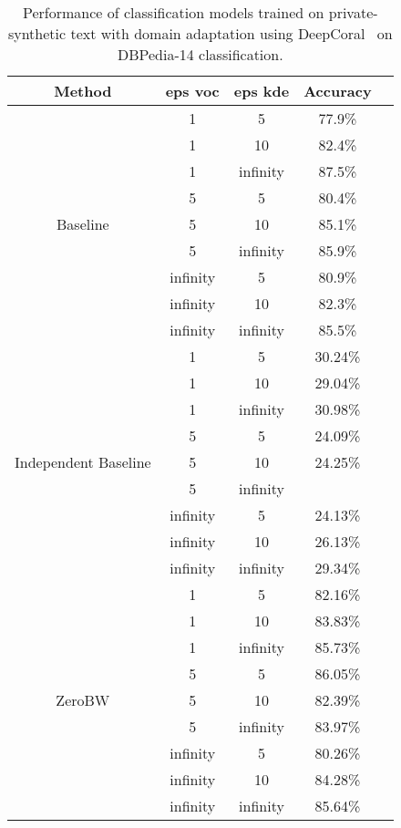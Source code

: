 \small{
\begin{table}
{
\begin{centering}
\begin{tabular}{c c c c c}
\toprule
Method &  eps voc & eps kde & Accuracy \\
\midrule
\rule{0pt}{3ex}
{} &   1 & 5 & 77.9\% \\
{}  & 1 & 10 & 82.4\% \\
{} &  1 & infinity & 87.5\% \\
\cline{2-4}
\rule{0pt}{3ex}
{} &  5 & 5 & 80.4\% \\
Baseline  & 5 & 10 & 85.1\% \\
{} &  5 & infinity & 85.9\% \\
\cline{2-4}
\rule{0pt}{3ex}
{} &  infinity & 5 & 80.9\% \\
  & infinity & 10 & 82.3\% \\
{} & infinity & infinity & 85.5\% \\
\midrule
\rule{0pt}{3ex}
{} &   1 & 5 & 30.24\% \\
{}  & 1 & 10 &  29.04\%\\
{} &  1 & infinity &  30.98\%\\
\cline{2-4}
\rule{0pt}{3ex}
{} &  5 & 5 &  24.09\%\\
Independent Baseline  & 5 & 10 &  24.25\%\\
{} &  5 & infinity &  \\
\cline{2-4}
\rule{0pt}{3ex}
{} &  infinity & 5 & 24.13\% \\
  & infinity & 10 &  26.13\%\\
{} & infinity & infinity &  29.34\%\\
\midrule
\rule{0pt}{3ex}
{} &   1 & 5 & 82.16\% \\
{}  & 1 & 10 & 83.83\% \\
{} &  1 & infinity & 85.73\% \\
\cline{2-4}
\rule{0pt}{3ex}
{} &  5 & 5 &  86.05\%\\
ZeroBW  & 5 & 10 &  82.39\%\\
{} &  5 & infinity & 83.97\% \\
\cline{2-4}
\rule{0pt}{3ex}
{} &  infinity & 5 & 80.26\% \\
  & infinity & 10 & 84.28\% \\
{} & infinity & infinity & 85.64\% \\
\bottomrule
\end{tabular}
\caption{Performance of classification models trained on private-synthetic text with domain adaptation using DeepCoral~\cite{sun2016deep} on DBPedia-14 classification.} \label{tbl:datasets}
\end{centering}}
\end{table}
}


